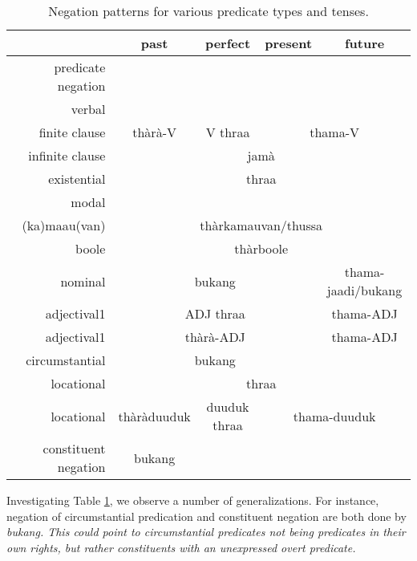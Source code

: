 \begin{table}
\begin{center}
\begin{tabular}{r|c|c|c|c|}
 & past & perfect & present & future \\\hline
\hline
predicate negation&&&&\\\hline
verbal&&&&\\
finite clause & thàrà-V & V thraa &  \multicolumn{2}{|c|}{thama-V}  \\\hline
infinite clause &  \multicolumn{4}{|c|}{jamà}  \\\hline
existential & \multicolumn{4}{|c|}{thraa}  \\\hline
modal&&&& \\ \hline
~(ka)maau(van) & \multicolumn{4}{|c|}{thàrkamauvan/thussa}  \\\hline
~boole & \multicolumn{4}{|c|}{thàrboole}   \\\hline
nominal &  \multicolumn{3}{|c|}{bukang} & thama-jaadi/bukang \\\hline
adjectival1 &  \multicolumn{3}{|c|}{ADJ thraa} & thama-ADJ \\\hline
adjectival1 &  \multicolumn{3}{|c|}{thàrà-ADJ} & thama-ADJ \\\hline
circumstantial &  \multicolumn{3}{|c|}{bukang} &  \\\hline
locational & \multicolumn{4}{|c|}{thraa}\footnotemark  \\\hline
locational & thàràduuduk & duuduk thraa & \multicolumn{2}{|c|}{thama-duuduk}\\\hline
\hline
\hline
constituent negation & bukang &  &  &
\end{tabular}
\end{center}
\caption[Negation patterns for various predicate types and tenses]{Negation patterns for various predicate types and tenses.}
\label{tab:func:negation}
\end{table}

Investigating Table \ref{tab:func:negation}, we observe a number of generalizations. For instance, negation of circumstantial predication and constituent negation are both done by \em bukang\em. This could point to circumstantial predicates not being predicates in their own rights, but rather constituents with an unexpressed overt predicate.

